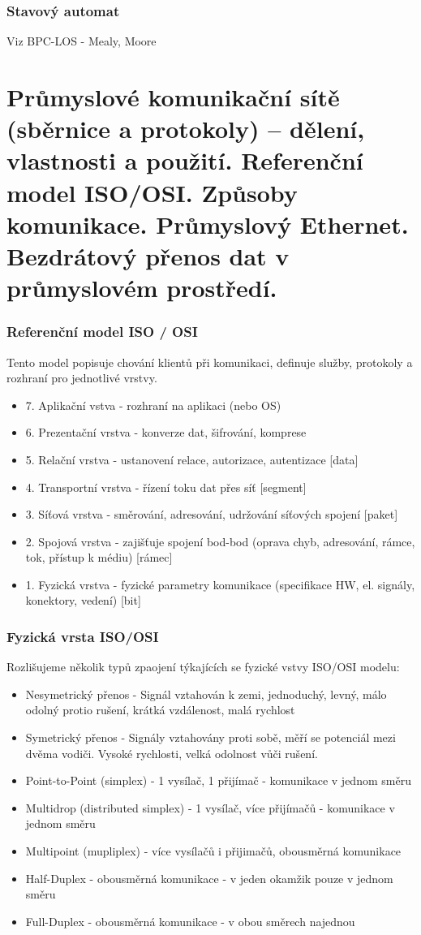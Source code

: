 \subsubsection*{Stavový automat}
Viz BPC-LOS - Mealy, Moore

\section{Průmyslové komunikační sítě (sběrnice a protokoly) – dělení, vlastnosti a použití. Referenční model ISO/OSI. Způsoby komunikace. Průmyslový Ethernet. Bezdrátový přenos dat v průmyslovém prostředí.}
\subsubsection*{Referenční model ISO / OSI}
Tento model popisuje chování klientů při komunikaci, definuje služby, protokoly a rozhraní pro jednotlivé vrstvy.
\begin{itemize}
    \item 7. Aplikační vstva - rozhraní na aplikaci (nebo OS)
    \item 6. Prezentační vrstva - konverze dat, šifrování, komprese
    \item 5. Relační vrstva - ustanovení relace, autorizace, autentizace [data]
    \item 4. Transportní vrstva - řízení toku dat přes síť [segment]
    \item 3. Síťová vrstva - směrování, adresování, udržování síťových spojení [paket]
    \item 2. Spojová vrstva - zajišťuje spojení bod-bod (oprava chyb, adresování, rámce, tok, přístup k médiu) [rámec]
    \item 1. Fyzická vrstva - fyzické parametry komunikace (specifikace HW, el. signály, konektory, vedení) [bit]
\end{itemize}

\subsubsection*{Fyzická vrsta ISO/OSI}
Rozlišujeme několik typů zpaojení týkajících se fyzické vstvy ISO/OSI modelu:
\begin{itemize}
    \item Nesymetrický přenos - Signál vztahován k zemi, jednoduchý, levný, málo odolný protio rušení, krátká vzdálenost, malá rychlost
    \item Symetrický přenos - Signály vztahovány proti sobě, měří se potenciál mezi dvěma vodiči. Vysoké rychlosti, velká odolnost vůči rušení.
    \item Point-to-Point (simplex) - 1 vysílač, 1 přijímač - komunikace v jednom směru
    \item Multidrop (distributed simplex) - 1 vysílač, více přijímačů - komunikace v jednom směru
    \item Multipoint (mupliplex) - více vysílačů i přijimačů, obousměrná komunikace
    \item Half-Duplex - obousměrná komunikace - v jeden okamžik pouze v jednom směru
    \item Full-Duplex - obousměrná komunikace - v obou směrech najednou
\end{itemize}


